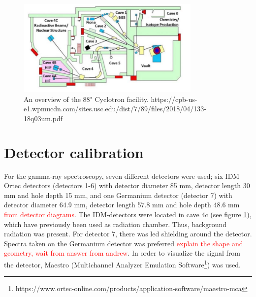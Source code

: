 \begin{figure}
    \centering
    \includegraphics[width=0.8\textwidth]{Experiment/LBL_88.png}
    \caption{An overview of the 88" Cyclotron facility. https://cpb-us-e1.wpmucdn.com/sites.usc.edu/dist/7/89/files/2018/04/133-18q03um.pdf }
    \label{fig:LBNL_88}
\end{figure}

\section{Detector calibration} \label{sec:detector_calibration}
\noindent  

For the gamma-ray spectroscopy, seven different detectors were used; six IDM Ortec detectors (detectors 1-6) with detector diameter 85 mm, detector length 30 mm and hole depth 15 mm, and one Germanium detector (detector 7) with detector diameter 64.9 mm, detector length 57.8 mm and hole depth 48.6 mm \textcolor{red}{from detector diagrams}. The IDM-detectors were located in cave 4c (see figure \ref{fig:LBNL_88}), which have previously been used as radiation chamber. Thus, background radiation was present. For detector 7, there was led shielding around the detector. Spectra taken on the Germanium detector was preferred \textcolor{red}{explain the shape and geometry, wait from answer from andrew}. In order to visualize the signal from the detector, Maestro  (Multichannel Analyzer Emulation Software\footnote{https://www.ortec-online.com/products/application-software/maestro-mca}) was used. \\


